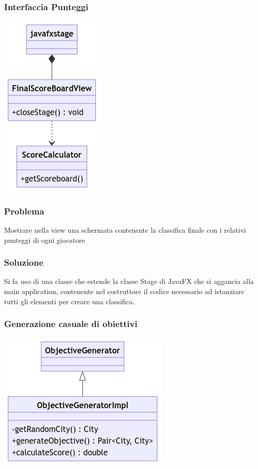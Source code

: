 \documentclass[a4paper,12pt]{report}
\begin{document}
\subsubsection{Interfaccia Punteggi}
\begin{center}
\includegraphics[scale=0.7]{interfacciapunteggiUML (1).png}
\end{center}

%
\subsubsection{Problema}
Mostrare nella view una schermata contenente la classifica finale con i relativi punteggi di ogni giocatore
%
\subsubsection{Soluzione}
Si fa uso di una classe che estende la classe Stage di JavaFX che si aggancia alla main application, contenente nel costruttore il codice necessario ad istanziare tutti gli elementi per creare una classifica.
\newpage
\subsubsection{Generazione casuale di obiettivi}
\begin{center}
\includegraphics[scale=0.7]{objectivegeneratorUML (1).png}
\end{center}
\end{document}

